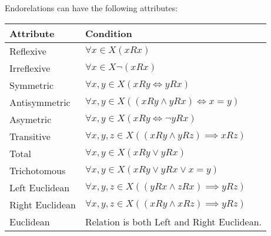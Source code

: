 Endorelations can have the following attributes:

\begin{tabular}{ll}
    \centering
    Attribute & Condition \\
    \toprule
    Reflexive       \index{Relation!Reflexive}       & $\forall x \in X (xRx)$ \\
    Irreflexive     \index{Relation!Irreflexive}     & $\forall x \in X \lnot (xRx)$ \\
    Symmetric       \index{Relation!Symmetric}       & $\forall x,y \in X (xRy \iff yRx) $ \\
    Antisymmetric   \index{Relation!Antisymmetric}   & $\forall x,y \in X ((xRy \land yRx) \iff x=y ) $ \\
    Asymetric       \index{Relation!Asymetric}       & $\forall x,y \in X (xRy \iff \lnot yRx) $ \\
    Transitive      \index{Relation!Transitive}      & $\forall x,y,z \in X ((xRy \land yRz) \implies xRz)$ \\
    Total           \index{Relation!Total}           & $\forall x,y \in X (xRy \lor yRx) $ \\
    Trichotomous    \index{Relation!Trichotomous}    & $\forall x,y \in X (xRy \lor yRx \lor x=y) $ \\
    Left Euclidean  \index{Relation!Left Euclidean}  & $\forall x,y,z \in X ((yRx \land zRx) \implies yRz)$ \\
    Right Euclidean \index{Relation!Right Euclidean} & $\forall x,y,z \in X ((xRy \land xRz) \implies yRz)$ \\
    Euclidean       \index{Relation!Euclidean}       & Relation is both Left and Right Euclidean.
\end{tabular}

